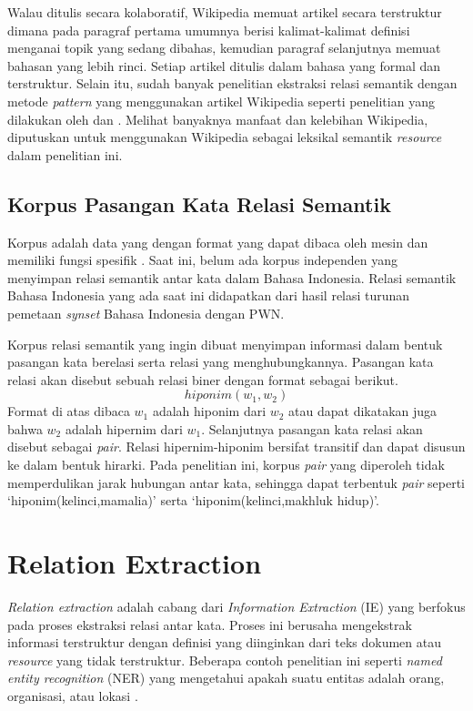 Walau ditulis secara kolaboratif, Wikipedia memuat artikel secara terstruktur dimana pada paragraf pertama umumnya berisi kalimat-kalimat definisi menganai topik yang sedang dibahas, kemudian paragraf selanjutnya memuat bahasan yang lebih rinci. Setiap artikel ditulis dalam bahasa yang formal dan terstruktur. Selain itu, sudah banyak penelitian ekstraksi relasi semantik dengan metode \textit{pattern} yang menggunakan artikel Wikipedia seperti penelitian yang dilakukan oleh \cite{ruiz2005automatic} dan \cite{arnold2014extracting}. Melihat banyaknya manfaat dan kelebihan Wikipedia, diputuskan untuk menggunakan Wikipedia sebagai leksikal semantik \textit{resource} dalam penelitian ini. 


\subsection{Korpus Pasangan Kata Relasi Semantik}
Korpus adalah data yang dengan format yang dapat dibaca oleh mesin dan memiliki fungsi spesifik \citep{atkins1992corpus}. Saat ini, belum ada korpus independen yang menyimpan relasi semantik antar kata dalam Bahasa Indonesia. Relasi semantik Bahasa Indonesia yang ada saat ini didapatkan dari hasil relasi turunan pemetaan \textit{synset} Bahasa Indonesia dengan PWN. 

Korpus relasi semantik yang ingin dibuat menyimpan informasi dalam bentuk pasangan kata berelasi serta relasi yang menghubungkannya. Pasangan kata relasi akan disebut sebuah relasi biner dengan format sebagai berikut.
\[ hiponim(w_1,w_2) \]
\noindent Format di atas dibaca $w_1$ adalah hiponim dari $w_2$ atau dapat dikatakan juga bahwa $w_2$ adalah hipernim dari $w_1$. Selanjutnya pasangan kata relasi akan disebut sebagai \textit{pair}. Relasi hipernim-hiponim bersifat transitif dan dapat disusun ke dalam bentuk hirarki. Pada penelitian ini, korpus \textit{pair} yang diperoleh tidak memperdulikan jarak hubungan antar kata, sehingga dapat terbentuk \textit{pair} seperti `hiponim(kelinci,mamalia)' serta `hiponim(kelinci,makhluk hidup)'.


\section{Relation Extraction}
\textit{Relation extraction} adalah cabang dari \textit{Information Extraction} (IE) yang berfokus pada proses ekstraksi relasi antar kata. Proses ini berusaha mengekstrak informasi terstruktur dengan definisi yang diinginkan dari teks dokumen atau \textit{resource} yang tidak terstruktur. Beberapa contoh penelitian ini seperti \textit{named entity recognition} (NER) yang mengetahui apakah suatu entitas adalah orang, organisasi, atau lokasi \citep{bikel1999algorithm}. 


